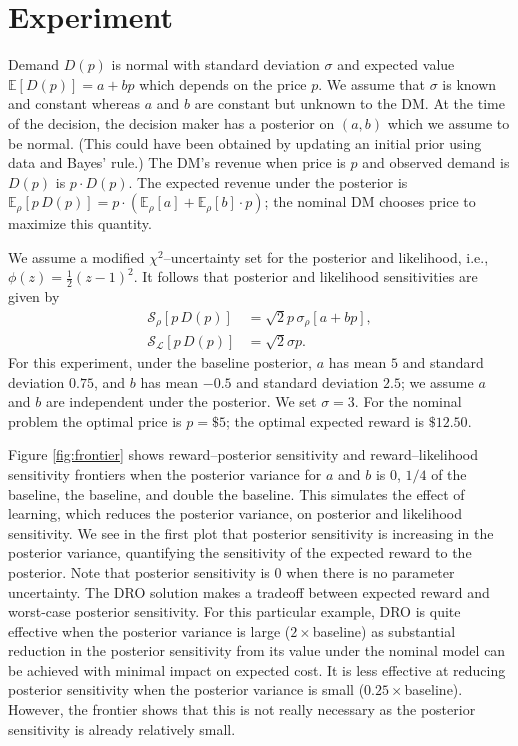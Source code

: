 \documentclass[11pt,reqno,letter]{amsart}
\theoremstyle{plain}
\theoremstyle{definition}
\numberwithin{equation}{section}
\numberwithin{theorem}{section}
\numberwithin{table}{section}
\numberwithin{figure}{section}
\begin{document}
\section{Experiment}
\label{sec:experiments}


Demand $D(p)$ is normal with standard deviation $\sigma$ and expected value ${\mathbb E}[D(p)] = a + b p$ which depends on the price $p$. We assume that $\sigma$ is known and constant whereas $a$ and $b$ are constant but unknown to the DM. At the time of the decision, the decision maker has a posterior on $(a, b)$ which we assume to be normal. (This could have been obtained by updating an initial prior using data and Bayes' rule.) The DM's revenue when price is $p$ and observed demand is $D(p)$ is $p\cdot D(p)$. The expected revenue under the posterior is ${\mathbb E}_\rho [p \, D(p)] = p \cdot ({\mathbb E}_\rho[a]  + {\mathbb E}_\rho[b]\cdot p)$; the nominal DM chooses price to maximize this quantity. 

We assume a modified $\chi^2$--uncertainty set for the posterior and likelihood, i.e., $\phi(z) = \frac{1}{2}(z-1)^2$. It follows that posterior and likelihood sensitivities are given by
\begin{align}
\label{eq:pricing-senitivities}
{\mathcal S}_\rho[p\, D(p)] & = \sqrt{2} p \, \sigma_\rho [a + b p], \\
{\mathcal S}_{\mathcal L}[p\, D(p)] & = \sqrt{2}\sigma p. \nonumber
\end{align}
For this experiment, under the baseline posterior, $a$ has mean $5$ and standard deviation $0.75$, and $b$ has mean $-0.5$ and standard deviation $2.5$; we assume $a$ and $b$ are independent under the posterior. We set $\sigma = 3$.  For the nominal problem the optimal price is $p =\$5$; the optimal expected reward is $\$12.50$.

Figure \ref{fig:frontier} shows reward--posterior sensitivity and reward--likelihood sensitivity frontiers when the posterior variance for $a$ and $b$ is 0, $1/4$ of the baseline, the baseline, and double the baseline. This simulates the effect of learning, which reduces the posterior variance, on posterior and likelihood sensitivity. We see in the first plot that posterior sensitivity is increasing in the posterior variance, quantifying the sensitivity of the expected reward to the posterior. Note that posterior sensitivity is $0$ when there is no parameter uncertainty. The DRO solution makes a tradeoff between expected reward and worst-case posterior sensitivity. For this particular example, DRO is quite effective when the posterior variance is large ($2\times$baseline) as substantial reduction in the posterior sensitivity from its value under the nominal model can be achieved with minimal impact on expected cost. It is less effective at reducing posterior sensitivity when the posterior variance is small ($0.25 \times$baseline). However, the frontier shows that this is not really necessary as the posterior sensitivity is already relatively small. %
\end{document}
